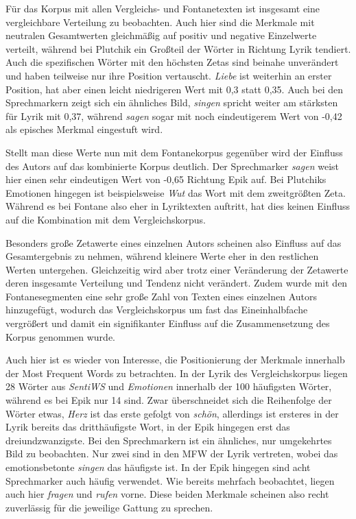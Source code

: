 \documentclass[a4paper,10p]{article}
\begin{document}
Für das Korpus mit allen Vergleichs- und Fontanetexten ist insgesamt eine vergleichbare Verteilung zu beobachten. Auch hier sind die Merkmale mit neutralen Gesamtwerten gleichmäßig auf positiv und negative Einzelwerte verteilt, während bei Plutchik ein Großteil der Wörter in Richtung Lyrik tendiert. Auch die spezifischen Wörter mit den höchsten Zetas sind beinahe unverändert und haben teilweise nur ihre Position vertauscht. \textit{Liebe} ist weiterhin an erster Position, hat aber einen leicht niedrigeren Wert mit 0,3 statt 0,35. Auch bei den Sprechmarkern zeigt sich ein ähnliches Bild, \textit{singen} spricht weiter am stärksten für Lyrik mit 0,37, während \textit{sagen} sogar mit noch eindeutigerem Wert von -0,42 als episches Merkmal eingestuft wird. \par 

Stellt man diese Werte nun mit dem Fontanekorpus gegenüber wird der Einfluss des Autors auf das kombinierte Korpus deutlich. Der Sprechmarker \textit{sagen} weist hier einen sehr eindeutigen Wert von -0,65 Richtung Epik auf. Bei Plutchiks Emotionen hingegen ist beispielsweise \textit{Wut} das Wort mit dem zweitgrößten Zeta. Während es bei Fontane also eher in Lyriktexten auftritt, hat dies keinen Einfluss auf die Kombination mit dem Vergleichskorpus. \par 


Besonders große Zetawerte eines einzelnen Autors scheinen also Einfluss auf das Gesamtergebnis zu nehmen, während kleinere Werte eher in den restlichen Werten untergehen. Gleichzeitig wird aber trotz einer Veränderung der Zetawerte deren insgesamte Verteilung und Tendenz nicht verändert. Zudem wurde mit den Fontanesegmenten eine sehr große Zahl von Texten eines einzelnen Autors hinzugefügt, wodurch das Vergleichskorpus um fast das Eineinhalbfache vergrößert und damit ein signifikanter Einfluss auf die Zusammensetzung des Korpus genommen wurde. \par 

Auch hier ist es wieder von Interesse, die Positionierung der Merkmale innerhalb der Most Frequent Words zu betrachten. In der Lyrik des Vergleichskorpus liegen 28 Wörter aus \textit{SentiWS} und \textit{Emotionen} innerhalb der 100 häufigsten Wörter, während es bei Epik nur 14 sind. Zwar überschneidet sich die Reihenfolge der Wörter etwas, \textit{Herz} ist das erste gefolgt von \textit{schön}, allerdings ist ersteres in der Lyrik bereits das dritthäufigste Wort, in der Epik hingegen erst das dreiundzwanzigste. Bei den Sprechmarkern ist ein ähnliches, nur umgekehrtes Bild zu beobachten. Nur zwei sind in den MFW der Lyrik vertreten, wobei das emotionsbetonte \textit{singen} das häufigste ist. In der Epik hingegen sind acht Sprechmarker auch häufig verwendet. Wie bereits mehrfach beobachtet, liegen auch hier \textit{fragen} und \textit{rufen} vorne. Diese beiden Merkmale scheinen also recht zuverlässig für die jeweilige Gattung zu sprechen. \par 
\end{document}
